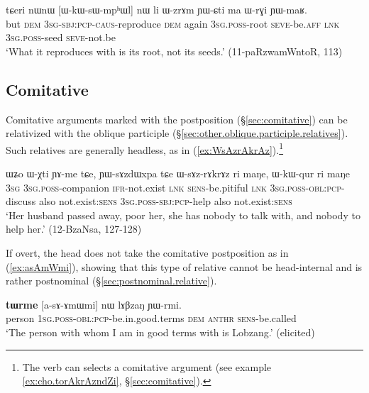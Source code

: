\begin{exe}
\ex \label{ex:WkWsWmphWl}
\gll tɕeri nɯnɯ [ɯ-kɯ-sɯ-mpʰɯl] nɯ li ɯ-zrɤm ɲɯ-ɕti ma ɯ-rɣi ɲɯ-maʁ.  \\
but \textsc{dem} \textsc{3sg}-\textsc{sbj}:\textsc{pcp}-\textsc{caus}-reproduce \textsc{dem} again \textsc{3sg}.\textsc{poss}-root \textsc{seve}-be.\textsc{aff} \textsc{lnk} \textsc{3sg}.\textsc{poss}-seed \textsc{seve}-not.be \\
\glt `What it reproduces with is its root, not its seeds.' (11-paRzwamWntoR, 113)
\end{exe}
 
\subsection{Comitative} \label{sec:comitative.relativization}
Comitative arguments marked with the postposition  (§\ref{sec:comitative}) can be relativized with the oblique participle (§\ref{sec:other.oblique.participle.relatives}). Such relatives are generally headless, as in (\ref{ex:WsAzrAkrAz}).\footnote{The verb  can selects a comitative argument (see example \ref{ex:cho.torAkrAzndZi}, §\ref{sec:comitative}). }

\begin{exe}
\ex \label{ex:WsAzrAkrAz}
\gll ɯʑo ɯ-χti ɲɤ-me tɕe, ɲɯ-sɤzdɯxpa tɕe ɯ-sɤz-rɤkrɤz ri maŋe, ɯ-kɯ-qur ri maŋe \\
 \textsc{3sg} \textsc{3sg}.\textsc{poss}-companion \textsc{ifr}-not.exist \textsc{lnk} \textsc{sens}-be.pitiful \textsc{lnk} \textsc{3sg}.\textsc{poss}-\textsc{obl}:\textsc{pcp}-discuss also not.exist:\textsc{sens} \textsc{3sg}.\textsc{poss}-\textsc{sbj}:\textsc{pcp}-help also not.exist:\textsc{sens} \\
\glt `Her husband passed away, poor her, she has nobody to talk with, and nobody to help her.' (12-BzaNsa, 127-128)
\end{exe}

If overt, the head does not take the comitative postposition  as in (\ref{ex:asAmWmi}), showing that this type of relative cannot be head-internal and is rather postnominal (§\ref{sec:postnominal.relative}).

\begin{exe}
\ex \label{ex:asAmWmi}
\gll \textbf{tɯrme} [a-sɤ-ɤmɯmi] nɯ lɤβzaŋ ɲɯ-rmi. \\
person \textsc{1sg}.\textsc{poss}-\textsc{obl}:\textsc{pcp}-be.in.good.terms \textsc{dem}  \textsc{anthr} \textsc{sens}-be.called \\
\glt `The person with whom I am in good terms with is Lobzang.' (elicited)
\end{exe}


